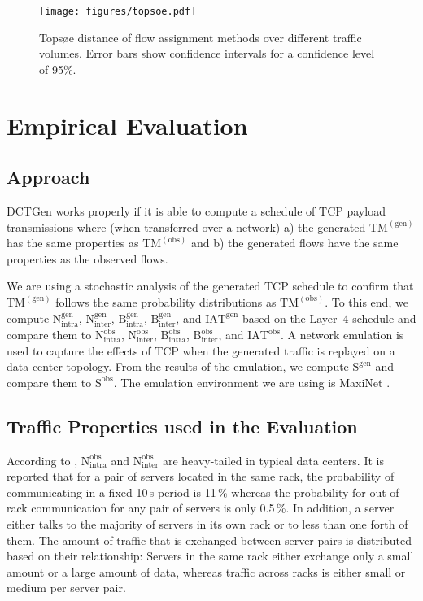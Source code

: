 \documentclass[journal,10pt]{IEEEtran}
\newcommand{\genname}{DCTGen}
\newcommand{\lf}{Layer~4}
\newcommand{\obstm}{\ensuremath{\mathrm{TM}^{(\mathrm{obs})}}}
\newcommand{\gentm}{\ensuremath{\mathrm{TM}^{(\mathrm{gen})}}}
\newcommand{\bytes}[2]{\ensuremath{\mathrm{B}^{\mathrm{#1}}_{\mathrm{#2}}}}
\newcommand{\partners}[2]{\ensuremath{\mathrm{N}^{\mathrm{#1}}_{\mathrm{#2}}}}
\newcommand{\iat}[1] {\ensuremath{\mathrm{IAT}^{\mathrm{#1}}}}
\newcommand{\size}[1]{\ensuremath{\mathrm{S}  ^{\mathrm{#1}}}}
\begin{document}
		\begin{figure}
			\centering
				\texttt{[image: figures/topsoe.pdf]}
				\caption{Topsøe distance of flow assignment methods over different traffic volumes. Error bars show confidence intervals for a confidence level of 95\%.}
				\label{fig:entropy}
		\end{figure}


\section{Empirical Evaluation}

\label{sec:evaluation}
	\subsection{Approach}		


		\genname{} works properly if it is able to compute a schedule of TCP payload transmissions where (when transferred over a network)
		a) the generated \gentm{} has the same properties as \obstm{} and 
		b) the generated flows have the same properties as the observed flows.
		
		We are using a stochastic analysis of the generated TCP schedule to confirm that \gentm{}
		follows the same probability distributions as \obstm{}.
		To this end, we compute 
		\partners{gen}{intra}, \partners{gen}{inter}, \bytes{gen}{intra}, \bytes{gen}{inter}, and \iat{gen}
		based on the \lf{} schedule and compare them to
		\partners{obs}{intra}, \partners{obs}{inter}, \bytes{obs}{intra}, \bytes{obs}{inter}, and \iat{obs}.
		A network emulation is used to capture the effects of TCP when the generated traffic is replayed on a data-center topology.
		From the results of the emulation, we compute \size{gen} and compare them to \size{obs}.
		The emulation environment we are using is MaxiNet \cite{wette14b}.
		
	

	\subsection{Traffic Properties used in the Evaluation}
According to \cite{MSR-datacenters}, \partners{obs}{intra} and \partners{obs}{inter} are heavy-tailed in typical data centers. 
It is reported that for a pair of
servers located in the same rack, the probability of communicating in a fixed 10\,s period is 11\,\% whereas the probability for out-of-rack 
communication for any pair of servers is only 0.5\,\%. 
In addition, a server either talks to the majority of servers in its own rack or to less than one forth of them.
The amount of traffic that is exchanged between server pairs is distributed based on their relationship: 
Servers in the same rack either exchange only a small amount or a large amount of data, 
whereas traffic across racks is either small or medium per server pair. 
\end{document}
